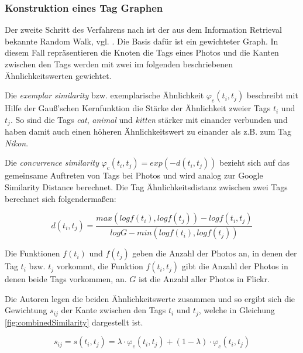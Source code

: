 




\subsubsection{Konstruktion eines Tag Graphen} %
\label{ssub:konstruktion_eines_tag_graphen}

Der zweite Schritt des Verfahrens nach \cite{ranking} ist der aus dem Information Retrieval bekannte Random Walk, vgl. \cite{bingLiu}. Die Basis dafür ist ein gewichteter Graph. In diesem Fall repräsentieren die Knoten die Tags eines Photos und die Kanten zwischen den Tags werden mit zwei im folgenden beschriebenen Ähnlichkeitswerten gewichtet.

Die \emph{exemplar similarity} bzw. exemplarische Ähnlichkeit $\varphi_e(t_i, t_j)$ beschreibt mit Hilfe der Gauß'schen Kernfunktion die Stärke der Ähnlichkeit zweier Tags $t_i$ und $t_j$. So sind die Tags \emph{cat}, \emph{animal} und \emph{kitten} stärker mit einander verbunden und haben damit auch einen höheren Ähnlichkeitswert zu einander als z.B. zum Tag \emph{Nikon}.

Die \emph{concurrence similarity} $\varphi_c(t_i, t_j) = exp(-d(t_i, t_j))$ bezieht sich auf das gemeinsame Auftreten von Tags bei Photos und wird analog zur Google Similarity Distance \cite{googleDistance} berechnet. Die Tag Ähnlichkeitsdistanz zwischen zwei Tags berechnet sich folgendermaßen:

\begin{figure}[hptb]
  \begin{equation}
  \label{fig:concurrenceDistance}
    d(t_i, t_j) = \frac{max(log f(t_i), log f(t_j)) - log f(t_i, t_j)}{log G - min(log f(t_i), log f(t_j))}
  \end{equation}
\end{figure}

Die Funktionen $f(t_i)$ und $f(t_j)$ geben die Anzahl der Photos an, in denen der Tag $t_i$ bzw. $t_j$ vorkommt, die Funktion $f(t_i, t_j)$ gibt die Anzahl der Photos in denen beide Tags vorkommen, an. $G$ ist die Anzahl aller Photos in Flickr.

Die Autoren legen die beiden Ähnlichkeitswerte zusammen und so ergibt sich die Gewichtung $s_{ij}$ der Kante zwischen den Tags $t_i$ und $t_j$, welche in Gleichung \ref{fig:combinedSimilarity} dargestellt ist.
\begin{figure}[!hptb]
  \begin{equation}
  \label{fig:combinedSimilarity}
    s_{ij} = s(t_i, t_j) = \lambda \cdot \varphi_e(t_i, t_j) + (1 - \lambda) \cdot \varphi_c(t_i, t_j)
  \end{equation}
\end{figure}

